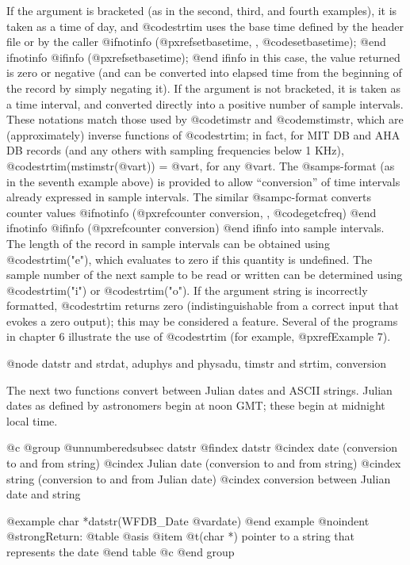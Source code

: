 {{{{{{{{If the argument is bracketed (as in the second, third, and fourth examples), it
is taken as a time of day, and @code{strtim} uses the base time defined
by the header file or by the caller
@ifnotinfo
(@pxref{setbasetime, , @code{setbasetime}});
@end ifnotinfo
@ifinfo
(@pxref{setbasetime});
@end ifinfo
in this case, the value returned is zero or negative (and can be
converted into elapsed time from the beginning of the record by simply
negating it).  If the argument is not bracketed, it is taken as a time
interval, and converted directly into a positive number of sample
intervals.  These notations match those used by @code{timstr} and
@code{mstimstr}, which are (approximately) inverse functions of
@code{strtim}; in fact, for MIT DB and AHA DB records (and any others
with sampling frequencies below 1 KHz), @code{strtim(mstimstr(@var{t}))}
= @var{t}, for any @var{t}.  The @samp{s}-format (as in the seventh
example above) is provided to allow ``conversion'' of time intervals
already expressed in sample intervals.  The similar @samp{c}-format
converts counter values
@ifnotinfo
(@pxref{counter conversion, , @code{getcfreq}})
@end ifnotinfo
@ifinfo
(@pxref{counter conversion})
@end ifinfo
into sample intervals.  The length of the record in
sample intervals can be obtained using @code{strtim("e")}, which
evaluates to zero if this quantity is undefined.  The sample number of
the next sample to be read or written can be determined using
@code{strtim("i")} or @code{strtim("o")}.  If the argument string is
incorrectly formatted, @code{strtim} returns zero (indistinguishable
from a correct input that evokes a zero output); this may be considered
a feature.  Several of the programs in chapter 6 illustrate the use of
@code{strtim} (for example, @pxref{Example 7}).

@node datstr and strdat, aduphys and physadu, timstr and strtim, conversion

The next two functions convert between Julian dates and ASCII strings.
Julian dates as defined by astronomers begin at noon GMT; these begin at
midnight local time.

@c @group
@unnumberedsubsec datstr
@findex datstr
@cindex date (conversion to and from string)
@cindex Julian date (conversion to and from string)
@cindex string (conversion to and from Julian date)
@cindex conversion between Julian date and string

@example
char *datstr(WFDB_Date @var{date})
@end example
@noindent
@strong{Return:}
@table @asis
@item @t{(char *)}
pointer to a string that represents the date
@end table
@c @end group

}}}}}}}}
